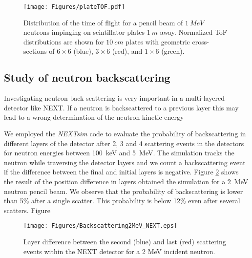 \begin{figure}[htb]
\centering
\texttt{[image: Figures/plateTOF.pdf]}
\caption{Distribution of the time of flight for a pencil beam of $1~MeV$ neutrons impinging on scintillator plates $1~m$ away. Normalized ToF distributions are shown for $10~cm$ plates with geometric cross-sections of $6 \times 6$ (blue), $3 \times 6$ (red), and $1 \times 6$ (green).}
\label{fig:plateTOF}
\end{figure}

\subsection{Study of neutron backscattering}

Investigating neutron back scattering is very important in a multi-layered detector like NEXT. If a neutron is backscattered to a previous layer this may lead to a wrong determination  of the neutron kinetic energy 

We employed the \emph{NEXTsim} code to evaluate the probability of backscattering in different layers of the detector after 2, 3 and 4 scattering events in the detectors for neutron energies between 100~keV and 5~MeV. The simulation tracks the neutron while traversing the detector layers and we count a backscattering event if the difference between the final and initial layers is negative. Figure  \ref{fig:backscattering} shows the result of the position difference in layers obtained the simulation for a 2~MeV neutron pencil beam. We observe that the probability of backscattering is lower than 5\% after a single scatter. This probability is below 12\% even after several scatters. Figure  

\begin{figure}[htb]
\centering
\texttt{[image: Figures/Backscattering2MeV\_NEXT.eps]}
\caption{Layer difference between the second (blue) and last (red) scattering events within the NEXT detector for a 2 MeV incident neutron.}
\label{fig:backscattering}
\end{figure}


%
%
%





